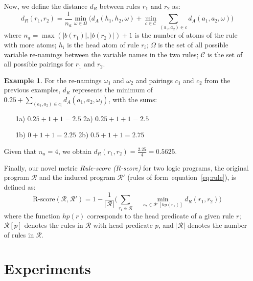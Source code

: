 \documentclass[letterpaper]{article} \usepackage{aaai20}  \usepackage{times}  \usepackage{helvet} \usepackage{courier}  \usepackage[hyphens]{url}  \usepackage{graphicx} \urlstyle{rm} \def\UrlFont{\rm}  \usepackage{graphicx}  \frenchspacing  \setlength{\pdfpagewidth}{8.5in}  \setlength{\pdfpageheight}{11in}  \usepackage{amsthm}
\theoremstyle{definition}
\newtheorem{example}{Example}[section]
\def\eqref#1{equation~\ref{#1}}
\begin{document}
Now, we define the distance $d_R$ between rules $r_1$ and $r_2$
as:
$$
d_R(r_1,r_2) = \frac{1}{n_a}\min_{\omega \in \Omega}\Big( d_A(h_1,h_2,\omega) + \min_{c \in \mathcal{C}} \sum_{(a_1,a_2) \in c} d_A(a_1, a_2, \omega) \Big)
$$
where
$n_a =\max(|b(r_1)|,|b(r_2)|)+1$ is the number of atoms of the rule with more atoms;
$h_i$ is the head atom of rule $r_i$;
$\Omega$ is the set of all possible variable re-namings between the variable names in the two rules;
$\mathcal{C}$ is the set of all possible pairings for $r_1$ and $r_2$. 



\begin{example}
For the re-namings $\omega_1$ and $\omega_2$ and pairings $c_1$ and $c_2$ from the previous examples, $d_R$ represents the minimum of $0.25+ \sum_{(a_1,a_2) \in c_i} d_A(a_1, a_2, \omega_j)$, with the sums:
\begin{itemize}
\item[1a)] $0.25 + 1 +1 = 2.5$ \hspace{0.3cm}2a)
\hspace{0.03cm}$0.25 + 1 +1 = 2.5$
\item[1b)] $0 + 1 +1 = 2.25$ \hspace{0.54cm}2b)
\hspace{0.03cm}$0.5 + 1 +1 = 2.75$
\end{itemize}
Given that $n_a=4$, we obtain $d_R(r_1,r_2) = \frac{2.25}{4} = 0.5625$.
\end{example}










Finally, our novel metric \emph{Rule-score (R-score)} for two logic programs, the original program $\mathcal{R}$ and the induced program $\mathcal{R}'$ (rules of form~\eqref{eq:rule}), is defined as:
$$
\text{R-score}(\mathcal{R},\mathcal{R}') = 
1 - \frac{1}{|\mathcal{R}|} 
\Big( \sum_{r_1 \in \mathcal{\mathcal{R}}} 
~ ~ ~ ~ ~ 
\min_{r_2 \in \mathcal{R}'[hp(r_1)]} d_R(r_1,r_2) \Big)
$$
where the function $hp(r)$ corresponds to the head predicate of a given rule $r$; 
$\mathcal{R}[p]$ denotes the rules in $\mathcal{R}$ with head predicate $p$, and $|\mathcal{R}|$ denotes the number of rules in $\mathcal{R}$.



\section{Experiments}\label{sec:experiments}
\end{document}
